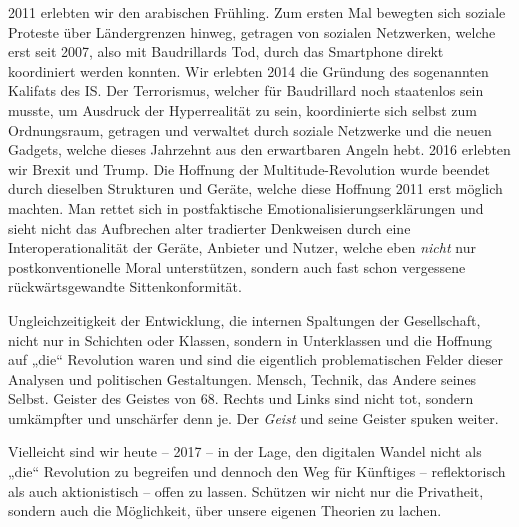 \documentclass[a4paper,11pt]{article}
\begin{document}
2011 erlebten wir den arabischen Frühling. Zum ersten Mal bewegten sich
soziale Proteste über Ländergrenzen hinweg, getragen von sozialen Netzwerken,
welche erst seit 2007, also mit Baudrillards Tod, durch das Smartphone direkt
koordiniert werden konnten. Wir erlebten 2014 die Gründung des sogenannten
Kalifats des IS. Der Terrorismus, welcher für Baudrillard noch staatenlos sein
musste, um Ausdruck der Hyperrealität zu sein, koordinierte sich selbst zum
Ordnungsraum, getragen und verwaltet durch soziale Netzwerke und die neuen
Gadgets, welche dieses Jahrzehnt aus den erwartbaren Angeln hebt. 2016
erlebten wir Brexit und Trump. Die Hoffnung der Multitude-Revolution wurde
beendet durch dieselben Strukturen und Geräte, welche diese Hoffnung 2011 erst
möglich machten.  Man rettet sich in postfaktische
Emotionalisierungserklärungen und sieht nicht das Aufbrechen alter tradierter
Denkweisen durch eine Interoperationalität der Geräte, Anbieter und Nutzer,
welche eben \emph{nicht} nur postkonventionelle Moral unterstützen, sondern
auch fast schon vergessene rückwärtsgewandte Sittenkonformität.

Ungleichzeitigkeit der Entwicklung, die internen Spaltungen der Gesellschaft,
nicht nur in Schichten oder Klassen, sondern in Unterklassen und die Hoffnung
auf „die“ Revolution waren und sind die eigentlich problematischen Felder
dieser Analysen und politischen Gestaltungen. Mensch, Technik, das Andere
seines Selbst. Geister des Geistes von 68.  Rechts und Links sind nicht tot,
sondern umkämpfter und unschärfer denn je. Der \emph{Geist} und seine Geister
spuken weiter.

Vielleicht sind wir heute -- 2017 -- in der Lage, den digitalen Wandel nicht
als „die“ Revolution zu begreifen und dennoch den Weg für Künftiges --
reflektorisch als auch aktionistisch -- offen zu lassen. Schützen wir nicht
nur die Privatheit, sondern auch die Möglichkeit, über unsere eigenen Theorien
zu lachen.

\ccnotice
\end{document}
